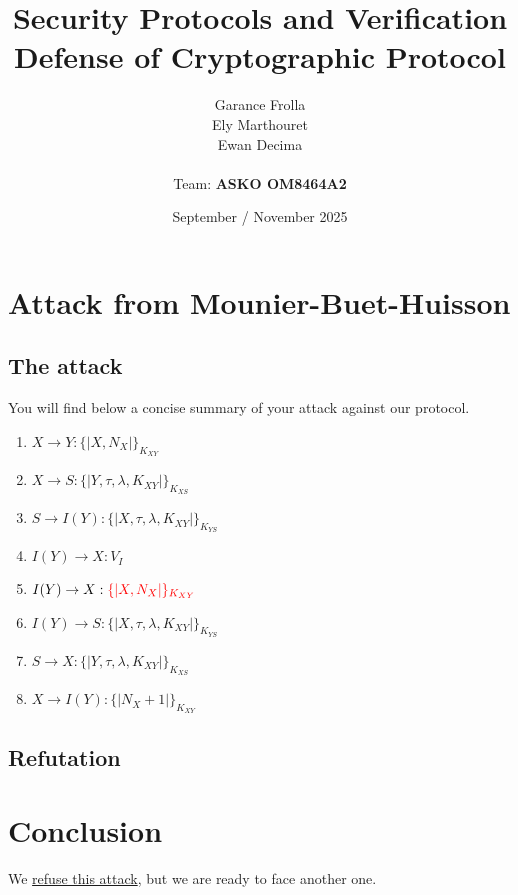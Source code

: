 \documentclass[11pt]{article}
\begin{document}
    \title{
            { \textbf{Security Protocols and Verification}} \\[1ex]
        {\small Defense of Cryptographic Protocol}
    }


    \author{
        Garance Frolla \\
        Ely Marthouret \\
        Ewan Decima\\ \\
        Team: \textbf{ASKO OM8464A2}
    }

    \date{September / November 2025}


    \maketitle
    \tableofcontents
    \newpage

    \section{Attack from Mounier-Buet-Huisson}

    \subsection{The attack}
    You will find below a concise summary of your attack against our protocol.

    \begin{enumerate}
        \item $X \rightarrow Y: \{|X, N_X|\}_{K_{XY}}$
        \item $X \rightarrow S : \{| Y, \tau, \lambda, K_{XY}|\}_{K_{XS}}$
        \item $S \rightarrow I(Y): \{|X, \tau, \lambda, K_{XY}|\}_{K_{YS}}$
        \item $I(Y) \rightarrow X: V_I$
        \item $I(Y) \rightarrow X: \textcolor{red}{\{|X, N_X|\}_{K_{XY}}}$
        \item $I(Y) \rightarrow S: \{|X, \tau, \lambda, K_{XY} |\}_{K_{YS}}$
        \item $S \rightarrow X : \{| Y, \tau, \lambda, K_{XY}|\}_{K_{XS}}$
        \item $X \rightarrow I(Y) : \{|N_X + 1|\}_{K_{XY}}$

    \end{enumerate}
    \subsection{Refutation}




    \section{Conclusion}
    We \underline{refuse this attack}, but we are ready to face another one.
\end{document}
